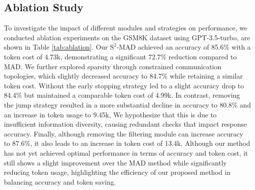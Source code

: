 \subsection{Ablation Study} 
To investigate the impact of different modules and strategies on performance, we conducted ablation experiments on the GSM8K dataset using GPT-3.5-turbo, are shown in Table \ref{tab:ablation}. Our \({\text{S}^2\text{-MAD}}\) achieved an accuracy of 85.6\% with a token cost of 4.73k, demonstrating a significant 72.7\% reduction compared to MAD. We further explored sparsity through constrained communication topologies, which slightly decreased accuracy to 84.7\% while retaining a similar token cost. Without the early stopping strategy led to a slight accuracy drop to 84.4\% but maintained a comparable token cost of 4.99k. In contrast, removing the jump strategy resulted in a more substantial decline in accuracy to 80.8\% and an increase in token usage to 9.45k, We hypothesize that this is due to insufficient information diversity, causing redundant checks that impact response accuracy. Finally, although removing the filtering module can increase accuracy to 87.6\%, it also leads to an increase in token cost of 13.4k. Although our method has not yet achieved optimal performance in terms of accuracy and token cost, it still shows a slight improvement over the MAD method while significantly reducing token usage, highlighting the efficiency of our proposed method in balancing accuracy and token saving.

